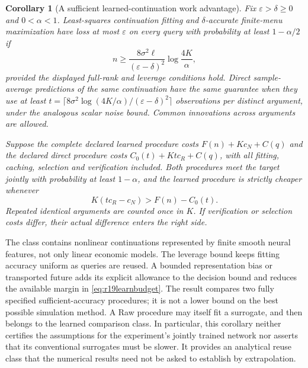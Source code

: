 \documentclass[ecta,nameyear,draft]{econsocart}
\newtheorem{corollary}[theorem]{Corollary}
\theoremstyle{definition}
\theoremstyle{remark}
\begin{document}
\begin{corollary}[A sufficient learned-continuation work advantage]
\label{cor:r19amortization}
Fix $\varepsilon>\delta\geq0$ and $0<\alpha<1$. Least-squares continuation
fitting and $\delta$-accurate finite-menu maximization have loss at most
$\varepsilon$ on every query with probability at least $1-\alpha/2$ if
\begin{equation}
 n\geq \frac{8\sigma^2\ell}{(\varepsilon-\delta)^2}
                    \log\frac{4K}{\alpha},
 \label{eq:r19learnbudget}
\end{equation}
provided the displayed full-rank and leverage conditions hold. Direct
sample-average predictions of the same continuation have the same guarantee
when they use at least
$t=\lceil8\sigma^2\log(4K/\alpha)/(\varepsilon-\delta)^2\rceil$
observations per distinct argument, under the analogous scalar noise bound.
Common innovations across arguments are allowed.

Suppose the complete declared learned procedure costs
$F(n)+Kc_N+C(q)$ and the declared direct procedure costs
$C_0(t)+Kt c_R+C(q)$, with all fitting, caching, selection and verification
included. Both procedures meet the target jointly with probability at least
$1-\alpha$, and the learned procedure is strictly cheaper whenever
\begin{equation}
 K(t c_R-c_N)>F(n)-C_0(t).
 \label{eq:r19explicitadvantage}
\end{equation}
Repeated identical arguments are counted once in $K$. If verification or
selection costs differ, their actual difference enters the right side.
\end{corollary}

The class contains nonlinear continuations represented by finite smooth
neural features, not only linear economic models. The leverage bound keeps
fitting accuracy uniform as queries are reused. A bounded representation
bias or transported future adds its explicit allowance to the decision bound
and reduces the available margin in \eqref{eq:r19learnbudget}. The result
compares two fully specified sufficient-accuracy procedures; it is not a
lower bound on the best possible simulation method. A Raw procedure may
itself fit a surrogate, and then belongs to the learned comparison class.
In particular, this corollary neither certifies the assumptions for the
experiment's jointly trained network nor asserts that its conventional
surrogates must be slower. It provides an analytical reuse class that the
numerical results need not be asked to establish by extrapolation.
\end{document}
